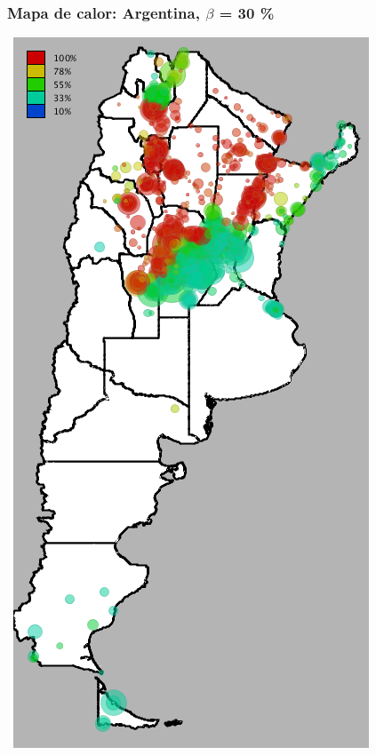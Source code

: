 \documentclass[xcolor=x11names]{beamer}
\begin{document}
\begin{frame}
	\frametitle{Mapa de calor: Argentina, $\beta$ = 30 \%}
	\center\
	\includegraphics[height=.9\textheight,width = .9\columnwidth, keepaspectratio]
	{slides/201112_hi_res_argentina_usuarios_proporcion_circulos_beta30.png}
\end{frame}
\end{document}
